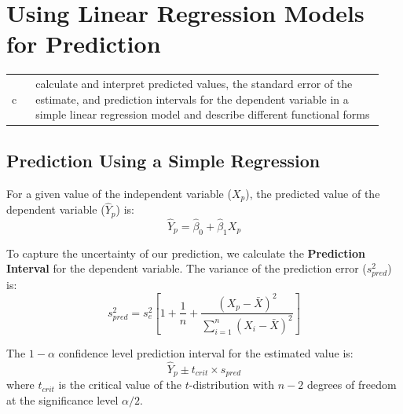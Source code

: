 \section{Using Linear Regression Models for Prediction}
\label{sec:Using Linear Regression Models for Prediction}

\begin{center}
\begin{tabular}{p{0.06\linewidth} | p{0.88\linewidth}}
	c & calculate and interpret predicted values, the standard error of the estimate, and prediction intervals for the dependent variable in a simple linear regression model and describe different functional forms \\
\end{tabular}
\end{center}

\subsection{Prediction Using a Simple Regression}
For a given value of the independent variable ($X_p$), the predicted value of the dependent variable ($\hat{Y}_p$) is:
\begin{equation}
	\hat{Y}_p = \hat{\beta}_0 + \hat{\beta}_1 X_p
	\label{eq:predicted_value_m10}
\end{equation}

To capture the uncertainty of our prediction, we calculate the \textbf{Prediction Interval} for the dependent variable. The variance of the prediction error ($s_{pred}^2$) is:
\begin{equation}
	s_{pred}^2 = s_e^2 \left[ 1 + \frac{1}{n} + \frac{(X_p - \bar{X})^2}{\sum_{i=1}^n (X_i - \bar{X})^2} \right]
	\label{eq:variance_prediction_error_m10}
\end{equation}

The $1-\alpha$ confidence level prediction interval for the estimated value is:
\begin{equation}
	\hat{Y}_p \pm t_{crit} \times s_{pred}
	\label{eq:prediction_interval_m10}
\end{equation}
where $t_{crit}$ is the critical value of the $t$-distribution with $n-2$ degrees of freedom at the significance level $\alpha/2$.

